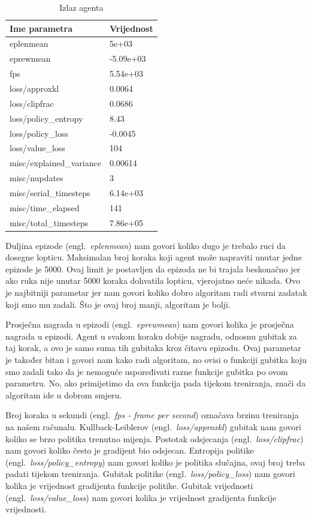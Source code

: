 \documentclass[times,utf8,diplomski]{fer}
\begin{document}
\begin{table}[ht!]
\centering
\caption{Izlaz agenta}
\label{tab:izlaz_agenta}
\begin{tabular}{@{}ll@{}}
\hline
Ime parametra   & Vrijednost \\
\hline
\hline
 eplenmean               & 5e+03       \\
 eprewmean               & -5.09e+03   \\
 fps                     & 5.54e+03    \\
 loss/approxkl           & 0.0064      \\
 loss/clipfrac           & 0.0686      \\
 loss/policy\_entropy     & 8.43       \\
 loss/policy\_loss        & -0.0045    \\
 loss/value\_loss         & 104        \\
 misc/explained\_variance & 0.00614    \\
 misc/nupdates          & 3           \\
 misc/serial\_timesteps   & 6.14e+03   \\
 misc/time\_elapsed       & 141        \\
 misc/total\_timesteps    & 7.86e+05   \\
\hline 
\end{tabular}
\end{table}

Duljina epizode (engl.~\emph{eplenmean}) nam govori koliko dugo je trebalo ruci da dosegne lopticu. Maksimalan broj koraka koji agent može napraviti unutar jedne epizode je 5000. Ovaj limit je postavljen da epizoda ne bi trajala beskonačno jer ako ruka nije unutar 5000 koraka dohvatila lopticu, vjerojatno neće nikada. Ovo je najbitniji parametar jer nam govori koliko dobro algoritam radi stvarni zadatak koji smo mu zadali. Što je ovaj broj manji, algoritam je bolji.

Prosječna nagrada u epizodi (engl.~\emph{eprewmean}) nam govori kolika je prosječna nagrada u epizodi. Agent u svakom koraku dobije nagradu, odnosnu gubitak za taj korak, a ovo je samo suma tih gubitaka kroz čitavu epizodu. Ovaj parametar je također bitan i govori nam kako radi algoritam, no ovisi o funkciji gubitka koju smo zadali tako da je nemoguće uspoređivati razne funkcije gubitka po ovom parametru. No, ako primijetimo da ova funkcija pada tijekom treniranja, znači da algoritam ide u dobrom smjeru.

Broj koraka u sekundi (engl.~\emph{fps - frame per second}) označava brzinu treniranja na našem računalu. Kullback-Leiblerov (engl.~\emph{loss/approxkl}) gubitak nam govori koliko se brzo politika trenutno mijenja. Postotak odsjecanja (engl.~\emph{loss/clipfrac}) nam govori koliko često je gradijent bio odsjecan. Entropija politike (engl.~\emph{loss/policy\_entropy}) nam govori koliko je politika slučajna, ovaj broj treba padati tijekom treniranja. Gubitak politike (engl.~\emph{loss/policy\_loss}) nam govori kolika je vrijednost gradijenta funkcije politike. Gubitak vrijednosti (engl.~\emph{loss/value\_loss}) nam govori kolika je vrijednost gradijenta funkcije vrijednosti.
\end{document}
